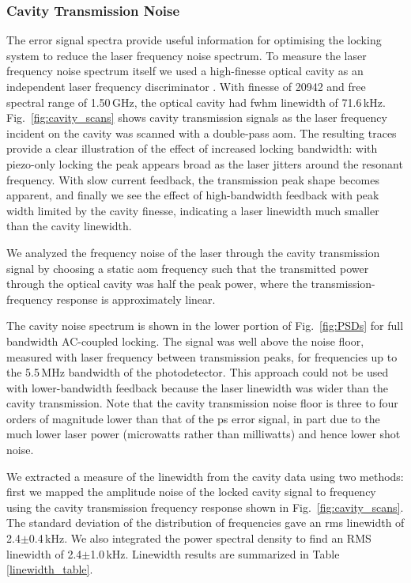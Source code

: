 
\subsubsection{Cavity Transmission Noise}
The error signal spectra provide useful information for optimising the locking system to reduce the laser frequency noise spectrum.
To measure the laser frequency noise spectrum itself we used a high-finesse optical cavity as an independent laser frequency discriminator \cite{equipment}.
With finesse of 20942 and free spectral range of 1.50\,GHz, the optical cavity had \gls*{fwhm} linewidth of 71.6\,kHz. 
Fig.~\ref{fig:cavity_scans} shows cavity transmission signals as the laser frequency incident on the cavity was scanned with a double-pass \gls*{aom}.
The resulting traces provide a clear illustration of the effect of increased locking bandwidth: with piezo-only locking the peak appears broad as the laser jitters around the resonant frequency.
With slow current feedback, the transmission peak shape becomes apparent, and finally we see the effect of high-bandwidth feedback with peak width limited by the cavity finesse, indicating a laser linewidth much smaller than the cavity linewidth.

We analyzed the frequency noise of the laser through the cavity transmission signal by choosing a static \gls*{aom} frequency such that the transmitted power through the optical cavity was half the peak power, where the transmission-frequency response is approximately linear. 

The cavity noise spectrum is shown in the lower portion of Fig.~\ref{fig:PSDs} for full bandwidth AC-coupled locking.
The signal was well above the noise floor, measured with laser frequency between transmission peaks, for frequencies up to the 5.5\,MHz bandwidth of the photodetector.
 This approach could not be used with lower-bandwidth feedback because the laser linewidth was wider than the cavity transmission.
 Note that the cavity transmission noise floor is three to four orders of magnitude lower than that of the \gls*{ps} error signal, in part due to the much lower laser power (microwatts rather than milliwatts) and hence lower shot noise.

We extracted a measure of the linewidth from the cavity data using two methods: first we mapped the amplitude noise of the locked cavity signal to frequency using the cavity transmission frequency response shown in Fig.~\ref{fig:cavity_scans}.
The standard deviation of the distribution of frequencies gave an \gls*{rms} linewidth of 2.4$\pm$0.4\,kHz.
We also integrated the power spectral density to find an RMS linewidth \cite{negnevitsky_wideband_2013} of 2.4$\pm$1.0\,kHz.
Linewidth results are summarized in Table \ref{linewidth_table}.

